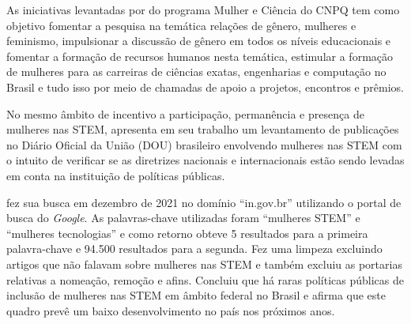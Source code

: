 As iniciativas levantadas por  do programa Mulher e Ciência do CNPQ  tem como objetivo fomentar a pesquisa na temática relações de gênero, mulheres e feminismo, impulsionar a discussão de gênero em todos os níveis educacionais e fomentar a formação de recursos humanos nesta temática, estimular a formação de mulheres para as carreiras de
ciências exatas, engenharias e computação no Brasil e tudo isso por meio de chamadas de apoio a projetos, encontros e prêmios.

No mesmo âmbito de incentivo a participação, permanência e presença de mulheres nas STEM,  apresenta em seu trabalho um levantamento de publicações no Diário Oficial da União (DOU) brasileiro envolvendo mulheres nas STEM com o intuito de verificar se as diretrizes nacionais e internacionais estão sendo levadas em conta na instituição de políticas públicas.

 fez sua busca em dezembro de 2021 no domínio “in.gov.br” utilizando o portal de busca do \textit{Google}. As palavras-chave utilizadas foram “mulheres STEM” e “mulheres tecnologias” e como retorno obteve 5 resultados para a primeira palavra-chave e 94.500 resultados para a segunda. Fez uma limpeza excluindo artigos que não falavam sobre mulheres nas STEM e também excluiu as portarias relativas a nomeação, remoção e afins. Concluiu que há raras políticas públicas de inclusão de mulheres nas STEM em âmbito federal no Brasil e afirma que este quadro prevê um baixo desenvolvimento no país nos próximos anos.










 













